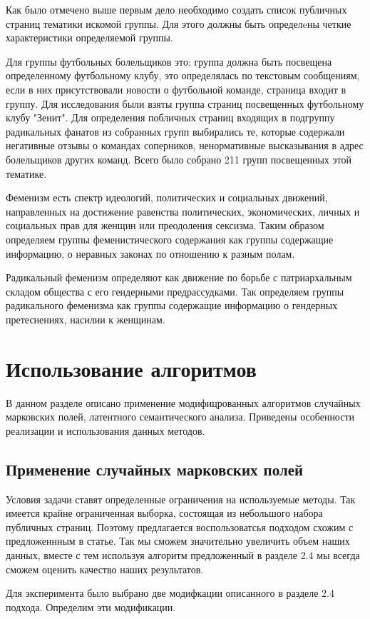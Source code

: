 \documentclass[annotation,times,page4]{itmo-student-thesis}
\begin{document}
Как было отмечено выше первым дело необходимо создать список публичных страниц тематики искомой группы. 
Для этого должны быть определeны четкие характеристики определяемой группы.

Для группы футбольных болельщиков это: группа должна быть посвещена определенному футбольному клубу, это определялась по текстовым сообщениям, если в них присутствовали новости о футбольной команде, страница входит в группу. Для исследования были взяты группа страниц посвещенных футбольному клубу "Зенит". Для определения побличных страниц входящих в подгруппу радикальных фанатов из собранных групп выбирались те, которые  содержали негативные отзывы о командах соперников, ненормативные высказывания в адрес болельщиков других команд. Всего было собрано 211 групп посвещенных этой тематике.

Феменизм есть спектр идеологий, политических и социальных движений, направленных на достижение равенства политических, экономических, личных и социальных прав для женщин или преодоления сексизма. Таким образом определяем группы феменистического содержания как группы содержащие информацию, о неравных законах по отношению к разным полам. 

Радикальный феменизм определяют как движение по борьбе с патриархальным складом общества с его гендерными предрассудками. Так определяем группы радикального феменизма как группы содержащие информацию о гендерных претеснениях, насилии к женщинам.

 
\section{Использование алгоритмов}
В данном разделе описано применение модифицрованных алгоритмов случайных марковских полей, латентного семантического анализа. Приведены особенности реализации и использования данных методов.
\subsection{Применение случайных марковских полей}
Условия задачи ставят определенные ограничения на используемые методы. Так имеется крайне ограниченная выборка, состоящая из небольшого набора публичных страниц. Поэтому предлагается воспользоватсья подходом схожим с предложеннным в статье. Так мы сможем значительно увеличить объем наших данных, вместе с тем используя алгоритм предложенный в разделе 2.4 мы всегда сможем оценить качество наших результатов.

Для эксперимента было выбрано две модифкации описанного в разделе 2.4 подхода. 
Определим эти модификации.
\end{document}
